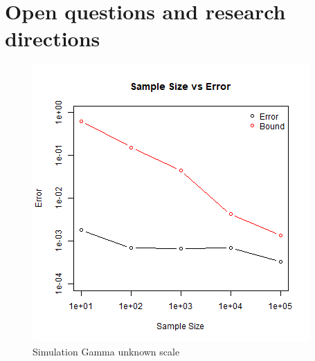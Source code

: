 

\section{Open questions and research directions}
\begin{figure}[h]
\includegraphics[scale=0.8]{../../../misc/rplot.jpg}
\centering
\caption{Simulation Gamma unknown scale}
\label{simulation}
\end{figure}